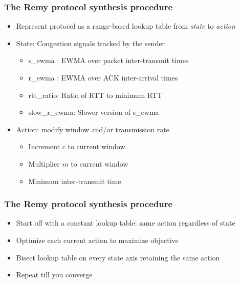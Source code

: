 \begin{frame}
\frametitle{The Remy protocol synthesis procedure}
\begin{itemize}
\item<1-> Represent protocol as a range-based lookup table from \textit{state} to \textit{action}
\item<2-> State: Congestion signals tracked by the sender
\begin{itemize}
\item s\_ewma : EWMA over packet inter-transmit times
\item r\_ewma : EWMA over ACK inter-arrival times
\item rtt\_ratio: Ratio of RTT to minimum RTT
\item slow\_r\_ewma: Slower version of s\_ewma
\end{itemize}
\item<3-> Action: modify window and/or transmission rate
\begin{itemize}
\item Increment $c$ to current window
\item Multiplier $m$ to current window
\item Minimum inter-transmit time.
\end{itemize}
\end{itemize}
\end{frame}

\begin{frame}
\frametitle{The Remy protocol synthesis procedure}
\begin{itemize}
\item Start off with a constant lookup table: same action regardless of state
\item Optimize each current action to maximize objective
\item Bisect lookup table on every state axis retaining the same action
\item Repeat till you converge
\end{itemize}
\end{frame}

